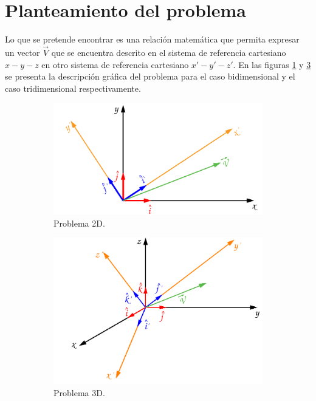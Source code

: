 \documentclass[12pt,letterpaper, twoside, openany]{article}
\begin{document}
\section{Planteamiento del problema}
%
Lo que se pretende encontrar es una relación matemática que permita  expresar un vector  $\overset{\rightarrow}{V}$ que se encuentra descrito en el sistema de referencia cartesiano $x-y-z$ en otro sistema de referencia cartesiano $x'-y'-z'$. En las figuras \ref{planteamiento} y \ref{planteamiento3d} se presenta la descripción gráfica del problema para el caso bidimensional y el caso tridimensional respectivamente.  
%
\begin{figure}[H]
%	
	\centering
	\begin{subfigure}[l]{0.450\textwidth}
		\includegraphics[width=\textwidth]{img/Planteamiento.pdf}
		\caption{Problema 2D.}
		\label{planteamiento}
	\end{subfigure}
	\hspace{.5 cm}
	\begin{subfigure}[r]{0.450\textwidth}
		\includegraphics[width=\textwidth]{img/Planteamiento3D.pdf}
		\caption{Problema 3D.}
		\label{planteamiento3d}
	\end{subfigure}	
	\caption{}
\end{figure}
%
%
\end{document}
